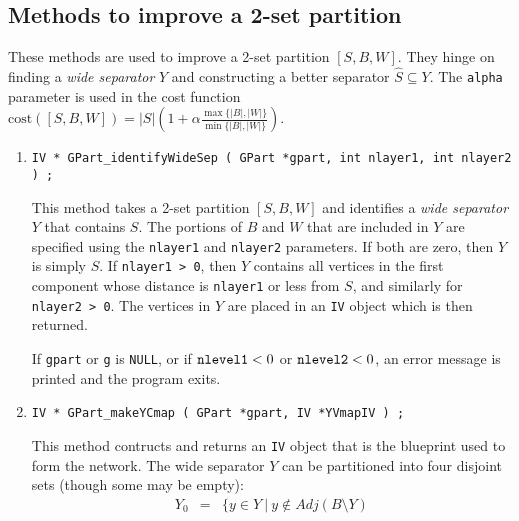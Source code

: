 \subsection{Methods to improve a 2-set partition}
\label{subsection:GPart:proto:improve}
\par
These methods are used to improve a 2-set partition $[S,B,W]$.
They hinge on finding a {\it wide separator} $Y$ and constructing a
better separator ${\widehat S} \subseteq Y$.
The {\tt alpha} parameter is used in the cost function
$\displaystyle
\mbox{cost}([S,B,W]) = |S|\left(1 + \alpha
\frac{\max\{|B|,|W|\}}
{\min\{|B|,|W|\}}
\right)
$.
\par
\begin{enumerate}
\item
\begin{verbatim}
IV * GPart_identifyWideSep ( GPart *gpart, int nlayer1, int nlayer2 ) ;
\end{verbatim}
This method takes a 2-set partition $[S,B,W]$ and identifies a {\it wide
separator} $Y$ that contains $S$.
The portions of $B$ and $W$ that are included in $Y$ are specified
using the {\tt nlayer1} and {\tt nlayer2} parameters.
If both are zero, then $Y$ is simply $S$.
If {\tt nlayer1 > 0}, then $Y$ contains all vertices 
in the first component whose distance is {\tt nlayer1} or less from
$S$, and similarly for {\tt nlayer2 > 0}.
The vertices in $Y$ are placed in an {\tt IV} object which is then
returned.
\par {}
If {\tt gpart} or {\tt g} is {\tt NULL},
or if ${\tt nlevel1} < 0$ or ${\tt nlevel2} < 0$,
an error message is printed and the program exits.
\item
\begin{verbatim}
IV * GPart_makeYCmap ( GPart *gpart, IV *YVmapIV ) ;
\end{verbatim}
This method contructs and returns an {\tt IV} object that is the
blueprint used to form the network.
The wide separator $Y$ can be partitioned into four disjoint sets
(though some may be empty):
\begin{eqnarray*}
Y_0 & = & \{y \in Y\ |\ 
            y \notin Adj(B \setminus Y)

\end{eqnarray*}
\end{enumerate}
